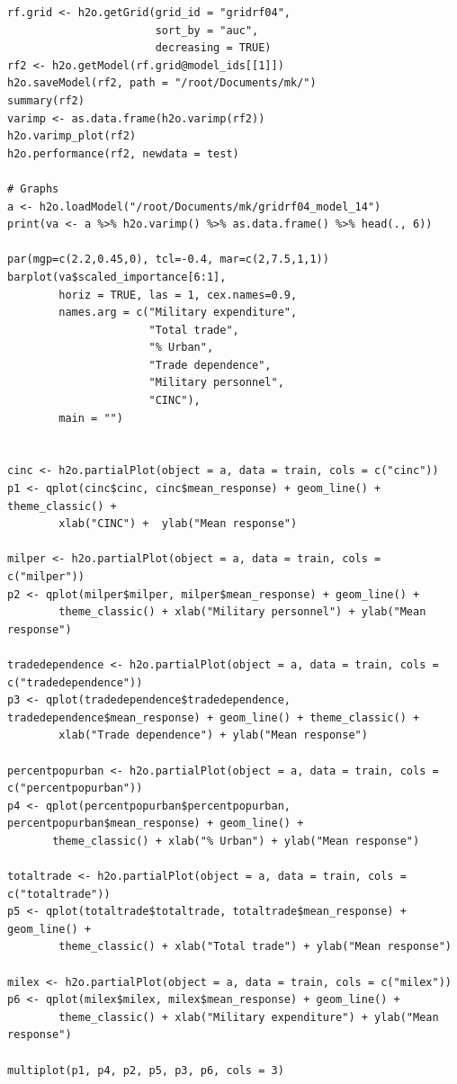 \documentclass[a4paper,12pt]{article}
\begin{document}
\begin{verbatim}
rf.grid <- h2o.getGrid(grid_id = "gridrf04",
                       sort_by = "auc",
                       decreasing = TRUE)
rf2 <- h2o.getModel(rf.grid@model_ids[[1]])
h2o.saveModel(rf2, path = "/root/Documents/mk/")
summary(rf2)
varimp <- as.data.frame(h2o.varimp(rf2))
h2o.varimp_plot(rf2)
h2o.performance(rf2, newdata = test)

# Graphs
a <- h2o.loadModel("/root/Documents/mk/gridrf04_model_14")
print(va <- a %>% h2o.varimp() %>% as.data.frame() %>% head(., 6)) 

par(mgp=c(2.2,0.45,0), tcl=-0.4, mar=c(2,7.5,1,1))
barplot(va$scaled_importance[6:1],
        horiz = TRUE, las = 1, cex.names=0.9,
        names.arg = c("Military expenditure",
                      "Total trade", 
                      "% Urban",
                      "Trade dependence",
                      "Military personnel",
                      "CINC"),
        main = "")


cinc <- h2o.partialPlot(object = a, data = train, cols = c("cinc"))
p1 <- qplot(cinc$cinc, cinc$mean_response) + geom_line() + theme_classic() + 
        xlab("CINC") +  ylab("Mean response")

milper <- h2o.partialPlot(object = a, data = train, cols = c("milper"))
p2 <- qplot(milper$milper, milper$mean_response) + geom_line() +
        theme_classic() + xlab("Military personnel") + ylab("Mean response")

tradedependence <- h2o.partialPlot(object = a, data = train, cols = c("tradedependence"))
p3 <- qplot(tradedependence$tradedependence, tradedependence$mean_response) + geom_line() + theme_classic() +
        xlab("Trade dependence") + ylab("Mean response")

percentpopurban <- h2o.partialPlot(object = a, data = train, cols = c("percentpopurban"))
p4 <- qplot(percentpopurban$percentpopurban, percentpopurban$mean_response) + geom_line() +
       theme_classic() + xlab("% Urban") + ylab("Mean response")

totaltrade <- h2o.partialPlot(object = a, data = train, cols = c("totaltrade"))
p5 <- qplot(totaltrade$totaltrade, totaltrade$mean_response) + geom_line() +
        theme_classic() + xlab("Total trade") + ylab("Mean response")

milex <- h2o.partialPlot(object = a, data = train, cols = c("milex"))
p6 <- qplot(milex$milex, milex$mean_response) + geom_line() +
        theme_classic() + xlab("Military expenditure") + ylab("Mean response")

multiplot(p1, p4, p2, p5, p3, p6, cols = 3)


\end{verbatim}
\end{document}
